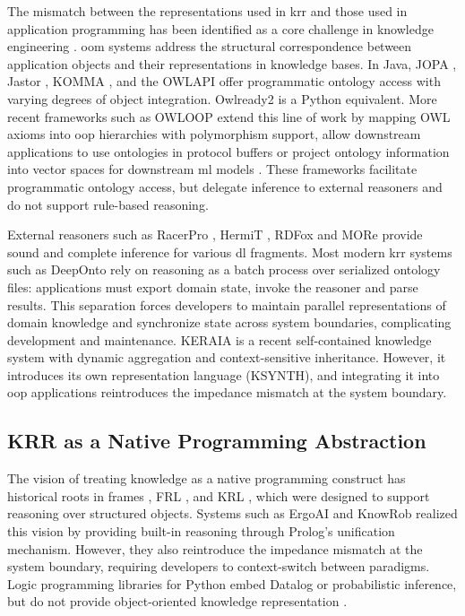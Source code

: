 \documentclass{article}
\begin{document}
The mismatch between the representations used in \ac{krr} and those used in application programming has been identified as a core challenge in knowledge engineering \cite{ledvinka2020comparison,baset2018object,banse2024owl2proto}. \Ac{oom} systems address the structural correspondence between application objects and their representations in knowledge bases. In Java, JOPA \cite{ledvinka2016jopa}, Jastor \cite{szekely2009jastor}, KOMMA \cite{wenzel2010komma}, and the OWLAPI \cite{horridge2011owl} offer programmatic ontology access with varying degrees of object integration. Owlready2 \cite{lamy2017owlready} is a Python equivalent. More recent frameworks such as OWLOOP \cite{buoncompagni2024owloop} extend this line of work by mapping OWL axioms into \ac{oop} hierarchies with polymorphism support, allow downstream applications to use ontologies in protocol buffers \cite{banse2024owl2proto} or project ontology information into vector spaces for downstream \ac{ml} models \cite{zhapa2023mowl}. These frameworks facilitate programmatic ontology access, but delegate inference to external reasoners and do not support rule-based reasoning.

External reasoners such as RacerPro \cite{haarslev2012racerpro}, HermiT \cite{glimm2014hermit}, RDFox \cite{nenov2015rdfox} and MORe \cite{armas2012more} provide sound and complete inference for various \ac{dl} fragments. Most modern \ac{krr} systems such as DeepOnto \cite{he2024deeponto} rely on reasoning as a batch process over serialized ontology files: applications must export domain state, invoke the reasoner and parse results. This separation forces developers to maintain parallel representations of domain knowledge and synchronize state across system boundaries, complicating development and maintenance. KERAIA \cite{varey2025keraia} is a recent self-contained knowledge system with dynamic aggregation and context-sensitive inheritance. However, it introduces its own representation language (KSYNTH), and integrating it into \ac{oop} applications reintroduces the impedance mismatch at the system boundary.

\subsection{KRR as a Native Programming Abstraction}

The vision of treating knowledge as a native programming construct has historical roots in frames \cite{minsky1974framework}, FRL \cite{roberts1977frl}, and KRL \cite{bobrow1977overview}, which were designed to support reasoning over structured objects. Systems such as ErgoAI \cite{kifer2018ergoai} and KnowRob \cite{beetz2018know} realized this vision by providing built-in reasoning through Prolog's unification mechanism. However, they also reintroduce the impedance mismatch at the system boundary, requiring developers to context-switch between paradigms. Logic programming libraries for Python embed Datalog or probabilistic inference, but do not provide object-oriented knowledge representation \cite{carbonnelle2020pydatalog,dries2015problog2}.
\end{document}
